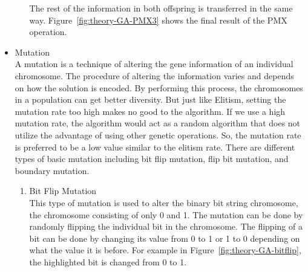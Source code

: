 \documentclass[12pt,oneside,openright,a4paper]{cpe-english-project}
\begin{document}
\begin{itemize}
\begin{enumerate}
		\begin{minipage}[c]{\textwidth}\centering
		\label{fig:theory-GA-PMX2}
		\end{minipage}

		The rest of the information in both offspring is transferred in the same way. Figure~\ref{fig:theory-GA-PMX3} shows the final result of the PMX operation.

		\begin{minipage}[c]{\textwidth}\centering
		\label{fig:theory-GA-PMX3}
		\end{minipage}

	\end{enumerate}
	\item Mutation \\
	A mutation is a technique of altering the gene information of an individual chromosome. The procedure of altering the information varies and depends on how the solution is encoded. By performing this process, the chromosomes in a population can get better diversity. But just like Elitism, setting the mutation rate too high makes no good to the algorithm. If we use a high mutation rate, the algorithm would act as a random algorithm that does not utilize the advantage of using other genetic operations. So, the mutation rate is preferred to be a low value similar to the elitism rate. There are different types of basic mutation including bit flip mutation, flip bit mutation, and boundary mutation.
	\begin{enumerate}
		\item Bit Flip Mutation \\
		This type of mutation is used to alter the binary bit string chromosome, the chromosome consisting of only 0 and 1. The mutation can be done by randomly flipping the individual bit in the chromosome. The flipping of a bit can be done by changing its value from 0 to 1 or 1 to 0 depending on what the value it is before. For example in Figure~\ref{fig:theory-GA-bitflip}, the highlighted bit is changed from 0 to 1.


\end{enumerate}
\end{itemize}
\end{document}
